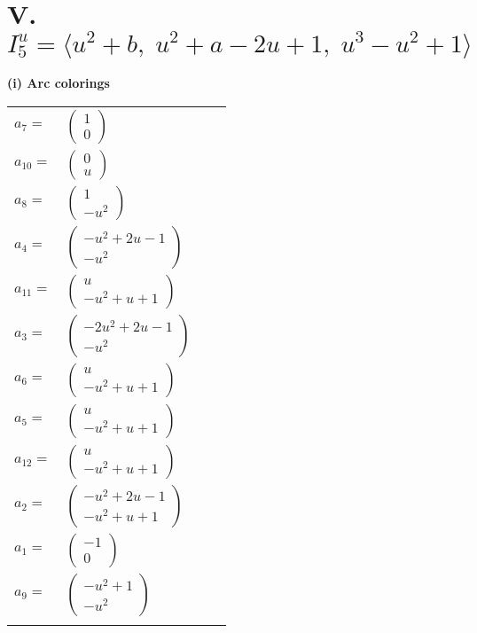 \documentclass[1p]{elsarticle_modified}
\theoremstyle{definition}
\begin{document}
\centering \section*{V. $I^u_{5}= \langle u^2+b,\;u^2+a-2 u+1,\;u^3- u^2+1 \rangle$}
\flushleft \textbf{(i) Arc colorings}\\
\begin{tabular}{m{7pt} m{180pt} m{7pt} m{180pt} }
\flushright $a_{7}=$&$\begin{pmatrix}1\\0\end{pmatrix}$ \\
\flushright $a_{10}=$&$\begin{pmatrix}0\\u\end{pmatrix}$ \\
\flushright $a_{8}=$&$\begin{pmatrix}1\\- u^2\end{pmatrix}$ \\
\flushright $a_{4}=$&$\begin{pmatrix}- u^2+2 u-1\\- u^2\end{pmatrix}$ \\
\flushright $a_{11}=$&$\begin{pmatrix}u\\- u^2+u+1\end{pmatrix}$ \\
\flushright $a_{3}=$&$\begin{pmatrix}-2 u^2+2 u-1\\- u^2\end{pmatrix}$ \\
\flushright $a_{6}=$&$\begin{pmatrix}u\\- u^2+u+1\end{pmatrix}$ \\
\flushright $a_{5}=$&$\begin{pmatrix}u\\- u^2+u+1\end{pmatrix}$ \\
\flushright $a_{12}=$&$\begin{pmatrix}u\\- u^2+u+1\end{pmatrix}$ \\
\flushright $a_{2}=$&$\begin{pmatrix}- u^2+2 u-1\\- u^2+u+1\end{pmatrix}$ \\
\flushright $a_{1}=$&$\begin{pmatrix}-1\\0\end{pmatrix}$ \\
\flushright $a_{9}=$&$\begin{pmatrix}- u^2+1\\- u^2\end{pmatrix}$\\&\end{tabular}
\end{document}
